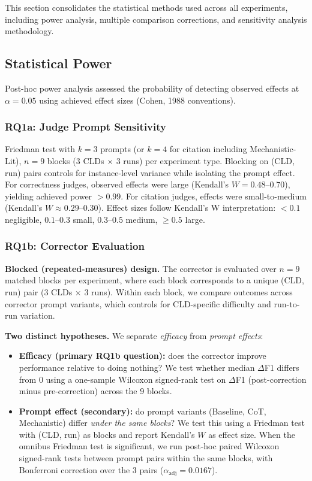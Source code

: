 This section consolidates the statistical methods used across all experiments, including power analysis, multiple comparison corrections, and sensitivity analysis methodology.

\subsection{Statistical Power}

Post-hoc power analysis assessed the probability of detecting observed effects at $\alpha = 0.05$ using achieved effect sizes (Cohen, 1988 conventions).

\subsubsection{RQ1a: Judge Prompt Sensitivity}
Friedman test with $k=3$ prompts (or $k=4$ for citation including Mechanistic-Lit), $n=9$ blocks (3 CLDs $\times$ 3 runs) per experiment type. Blocking on (CLD, run) pairs controls for instance-level variance while isolating the prompt effect. For correctness judges, observed effects were large (Kendall's $W = 0.48$--$0.70$), yielding achieved power $>0.99$. For citation judges, effects were small-to-medium (Kendall's $W \approx 0.29$--$0.30$). Effect sizes follow Kendall's W interpretation: $<0.1$ negligible, $0.1$--$0.3$ small, $0.3$--$0.5$ medium, $\geq 0.5$ large.

\subsubsection{RQ1b: Corrector Evaluation}
\textbf{Blocked (repeated-measures) design.} The corrector is evaluated over $n=9$ matched blocks per experiment, where each block corresponds to a unique (CLD, run) pair (3 CLDs $\times$ 3 runs). Within each block, we compare outcomes across corrector prompt variants, which controls for CLD-specific difficulty and run-to-run variation.

\textbf{Two distinct hypotheses.} We separate \textit{efficacy} from \textit{prompt effects}:
\begin{itemize}[noitemsep]
    \item \textbf{Efficacy (primary RQ1b question):} does the corrector improve performance relative to doing nothing? We test whether median $\Delta$F1 differs from 0 using a one-sample Wilcoxon signed-rank test on $\Delta$F1 (post-correction minus pre-correction) across the 9 blocks.
    \item \textbf{Prompt effect (secondary):} do prompt variants (Baseline, CoT, Mechanistic) differ \textit{under the same blocks}? We test this using a Friedman test with (CLD, run) as blocks and report Kendall's $W$ as effect size. When the omnibus Friedman test is significant, we run post-hoc paired Wilcoxon signed-rank tests between prompt pairs within the same blocks, with Bonferroni correction over the 3 pairs ($\alpha_{\text{adj}}=0.0167$).
\end{itemize}

